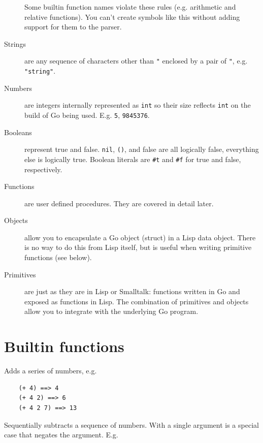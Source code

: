 \documentclass[12pt]{article}
\begin{document}
\begin{description}
Some builtin function names violate these rules (e.g. arithmetic and
relative functions). You can't create symbols like this without
adding support for them to the parser.

\item[Strings] are any sequence of characters other than \verb|"|
enclosed by a pair of \verb|"|, e.g. \verb|"string"|.

\item[Numbers] are integers internally represented as \verb|int| so their size reflects \verb|int| on the build of Go being used. E.g. \verb|5|, \verb|9845376|.

\item[Booleans] represent true and false. \verb|nil|, \verb|()|, and
false are all logically false, everything else is logically true. Boolean literals are \verb|#t| and \verb|#f| for true and false, respectively.

\item[Functions] are user defined procedures. They are covered in
detail later.

\item[Objects] allow you to encapsulate a Go object (struct) in a Lisp
  data object. There is no way to do this from Lisp itself, but is useful when writing primitive functions (see below).

\item[Primitives] are just as they are in Lisp or Smalltalk: functions
  written in Go and exposed as functions in Lisp. The combination of
  primitives and objects allow you to integrate with the underlying Go program.

\end{description}

\section{Builtin functions}


Adds a series of numbers, e.g.

\begin{verbatim}
    (+ 4) ==> 4
    (+ 4 2) ==> 6
    (+ 4 2 7) ==> 13
\end{verbatim}


Sequentially subtracts a sequence of numbers. With a single argument is a special case that negates the argument. E.g.
\end{document}
